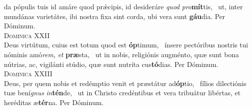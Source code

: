 \begin{translatioMulticol}{2}
da pópulis tuis id amáre quod prǽcipis, id desideráre \textit{quod} \textit{pro}\textbf{mít}tis,~\grestar{}
ut, inter mundánas varietátes, ibi nostra fixa sint corda, ubi vera sunt \textbf{gáu}dia. Per Dóminum.\\
{\color{red}\textsc{Dominica XXII}}\\
Deus virtútum, cuius est totum quod est \textbf{óp}timum,~\gredagger{}
ínsere pectóribus nostris tui nóminis amó\textit{rem,} \textit{et} \textbf{præ}sta,~\grestar{}
ut in nobis, religiónis augménto, quæ sunt bona nútrias, ac, vigilánti stúdio, quæ sunt nutríta cus\textbf{tó}dias. Per Dóminum.\\
{\color{red}\textsc{Dominica XXIII}}\\
Deus, per quem nobis et redémptio venit et præstátur ad\textbf{óp}tio,~\gredagger{}
fílios dilectiónis tuæ bení\textit{gnus} \textit{in}\textbf{tén}de,~\grestar{}
ut in Christo credéntibus et vera tribuátur libértas, et heréditas æ\textbf{tér}na. Per Dóminum.\columnbreak


\end{translatioMulticol}

